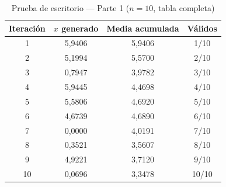 \documentclass[12pt,a4paper]{article}
\begin{document}
\begin{table}[H]
\centering
\caption{Prueba de escritorio — Parte 1 ($n=10$, tabla completa)}
\begin{tabular}{cccc}
\toprule
\textbf{Iteración} & \textbf{$x$ generado} & \textbf{Media acumulada} & \textbf{Válidos} \\
\midrule
1 & 5,9406 & 5,9406 & 1/10 \\
2 & 5,1994 & 5,5700 & 2/10 \\
3 & 0,7947 & 3,9782 & 3/10 \\
4 & 5,9445 & 4,4698 & 4/10 \\
5 & 5,5806 & 4,6920 & 5/10 \\
6 & 4,6739 & 4,6890 & 6/10 \\
7 & 0,0000 & 4,0191 & 7/10 \\
8 & 0,3521 & 3,5607 & 8/10 \\
9 & 4,9221 & 3,7120 & 9/10 \\
10 & 0,0696 & 3,3478 & 10/10 \\
\bottomrule
\end{tabular}
\end{table}
\end{document}
